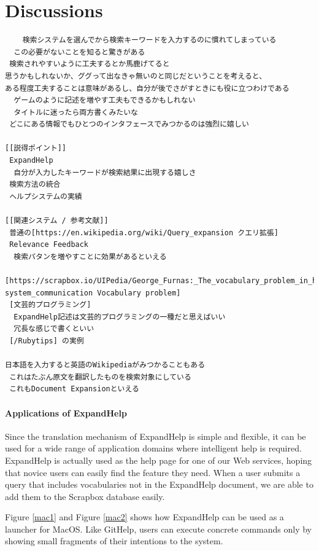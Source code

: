 \documentclass[manuscript,screen,review]{acmart}
\def\GH{\textsf{GitHelp}}
\def\EH{\textsf{ExpandHelp}}
\def\SB{\textsf{Scrapbox}}
\begin{document}
\section{Discussions}

\begin{verbatim}
    検索システムを選んでから検索キーワードを入力するのに慣れてしまっている
  この必要がないことを知ると驚きがある
 検索されやすいように工夫するとか馬鹿げてると
思うかもしれないか、ググって出なきゃ無いのと同じだということを考えると、
ある程度工夫することは意味があるし、自分が後でさがすときにも役に立つわけである
  ゲームのように記述を増やす工夫もできるかもしれない
  タイトルに迷ったら両方書くみたいな
 どこにある情報でもひとつのインタフェースでみつかるのは強烈に嬉しい

[[説得ポイント]]
 ExpandHelp
  自分が入力したキーワードが検索結果に出現する嬉しさ
 検索方法の統合
 ヘルプシステムの実績

[[関連システム / 参考文献]]
 普通の[https://en.wikipedia.org/wiki/Query_expansion クエリ拡張]
 Relevance Feedback
  検索パタンを増やすことに効果があるといえる
 [https://scrapbox.io/UIPedia/George_Furnas:_The_vocabulary_problem_in_human-system_communication Vocabulary problem]
 [文芸的プログラミング]
  ExpandHelp記述は文芸的プログラミングの一種だと思えばいい
  冗長な感じで書くといい
 [/Rubytips] の実例

日本語を入力すると英語のWikipediaがみつかることもある
 これはたぶん原文を翻訳したものを検索対象にしている
 これもDocument Expansionといえる

\end{verbatim}

\paragraph{Applications of ExpandHelp}

Since the translation mechanism of {\EH} is simple and flexible,
it can be used for a wide range of application domains where
intelligent help is required.
{\EH} is actually used as the help page for
one of our Web services, hoping that
novice users can easily find the feature they need.
When a user submits a query that includes vocabularies
not in the {\EH} document,
we are able to add them to the {\SB} database easily.

Figure \ref{mac1} and Figure \ref{mac2} shows how
{\EH} can be used as a launcher for MacOS.
Like {\GH}, users can execute concrete commands only by
showing small fragments of their intentions to the system.
\end{document}
